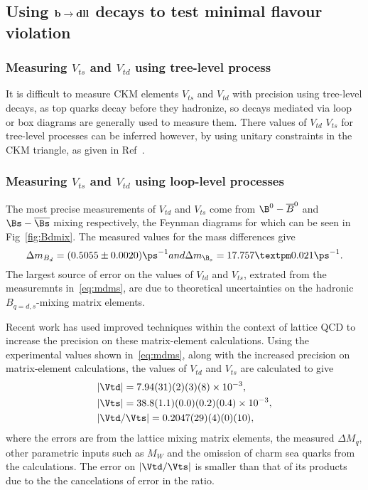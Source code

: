 \subsection{Using $\bf{b\to dll}$ decays to test minimal flavour
violation}
\subsubsection{Measuring $V_{ts}$ and $V_{td}$ using tree-level process}
It is difficult to measure CKM elements $V_{ts}$ and $V_{td}$ with
precision using tree-level decays, as top quarks decay before they
hadronize,  so decays mediated via loop or box diagrams are generally used to
measure them. There values of $V_{td}$ $V_{ts}$ for tree-level
processes can be inferred however, by using unitary constraints
in the CKM triangle, as given in Ref~\cite{ckm}.
\subsubsection{Measuring $V_{ts}$ and $V_{td}$ using loop-level processes}
\label{subsubsec:loop}
The most precise measurements of $V_{td}$ and $V_{ts}$ come from
$\B^{0}-\overline{B}^{0}$ and $\Bs-\overline{\Bs}$ mixing
respectively, the Feynman diagrams for which can be seen in
Fig~\ref{fig:Bdmix}.
The measured values for the mass differences give \cite{pdg} \cite{bslhcb}
\begin{equation}
  \Delta m_{B_{d}} = (0.5055\pm0.0020)\ps^{-1}  $$and$$
\Delta m_{\B_{s}} = 17.757 ± 0.021\ps^{-1}.
\label{eq:mdms}
\end{equation}
The largest source of error on the values of $V_{td}$ and $V_{ts}$,
extrated from the measuremnts in~\autoref{eq:mdms}, are due to theoretical uncertainties on the hadronic $B_{q = d,s}$-mixing matrix elements.


Recent work \cite{vtdvts} has used improved
techniques within the context of lattice QCD to increase the
precision on these  matrix-element calculations. Using the
experimental values shown in~\autoref{eq:mdms}, along with the
increased precision on matrix-element calculations, the values of
$V_{td}$ and $V_{ts}$ are calculated to give
\begin{equation}
  \begin{split}
    & |\Vtd| = 7.94(31)(2)(3)(8)\times 10^{-3},\\
& |\Vts| = 38.8(1.1)(0.0)(0.2)(0.4)\times 10^{-3},\\
& |\Vtd/\Vts| = 0.2047(29)(4)(0)(10),
  \end{split}
\end{equation}
where the errors are from the lattice mixing matrix elements, the measured $\Delta M_{q}$, other parametric inputs such as $M_{W}$ and the omission of charm sea quarks from the calculations. The error on $|\Vtd/\Vts|$ is smaller than that of its products due to the the cancelations of error in the ratio.

